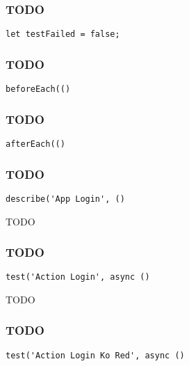 \documentclass[a4paper]{article}
\begin{document}
\hypertarget{toc461}{}
\subsubsection{TODO}

\begin{lstlisting}
let testFailed = false;
\end{lstlisting}

\hypertarget{toc462}{}
\subsubsection{TODO}

\begin{lstlisting}
beforeEach(()
\end{lstlisting}

\hypertarget{toc463}{}
\subsubsection{TODO}

\begin{lstlisting}
afterEach(()
\end{lstlisting}

\hypertarget{toc464}{}
\subsubsection{TODO}

\begin{lstlisting}
describe('App Login', ()
\end{lstlisting}

TODO

\hypertarget{toc465}{}
\subsubsection{TODO}

\begin{lstlisting}
test('Action Login', async ()
\end{lstlisting}

TODO

\hypertarget{toc466}{}
\subsubsection{TODO}

\begin{lstlisting}
test('Action Login Ko Red', async ()
\end{lstlisting}
\end{document}
